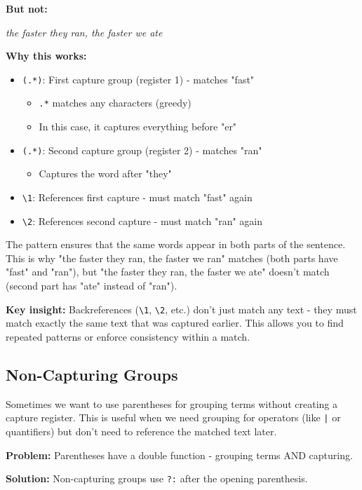 \documentclass[11pt,a4paper]{article}
\theoremstyle{definition}
\theoremstyle{plain}
\theoremstyle{remark}
\begin{document}
\textbf{But not:}

\textit{the faster they ran, the faster we ate}

\textbf{Why this works:}
\begin{itemize}
    \item \texttt{(.*)}: First capture group (register 1) - matches "fast"
    \begin{itemize}
        \item \texttt{.*} matches any characters (greedy)
        \item In this case, it captures everything before "er"
    \end{itemize}
    \item \texttt{(.*)}: Second capture group (register 2) - matches "ran"
    \begin{itemize}
        \item Captures the word after "they"
    \end{itemize}
    \item \verb|\1|: References first capture - must match "fast" again
    \item \verb|\2|: References second capture - must match "ran" again
\end{itemize}

The pattern ensures that the same words appear in both parts of the sentence. This is why "the faster they ran, the faster we ran" matches (both parts have "fast" and "ran"), but "the faster they ran, the faster we ate" doesn't match (second part has "ate" instead of "ran").

\textbf{Key insight:} Backreferences (\verb|\1|, \verb|\2|, etc.) don't just match any text - they must match exactly the same text that was captured earlier. This allows you to find repeated patterns or enforce consistency within a match.

\subsection{Non-Capturing Groups}

Sometimes we want to use parentheses for grouping terms without creating a capture register. This is useful when we need grouping for operators (like \texttt{|} or quantifiers) but don't need to reference the matched text later.

\textbf{Problem:} Parentheses have a double function - grouping terms AND capturing.

\textbf{Solution:} Non-capturing groups use \texttt{?:} after the opening parenthesis.
\end{document}
